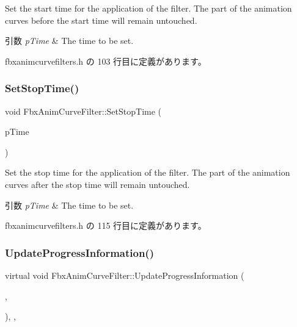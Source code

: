 Set the start time for the application of the filter. The part of the animation curves before the start time will remain untouched. 
\begin{DoxyParams}{引数}
{\em p\+Time} & The time to be set. \\
\hline
\end{DoxyParams}


 fbxanimcurvefilters.\+h の 103 行目に定義があります。

\mbox{\label{class_fbx_anim_curve_filter_a75fd5bf41a315dd12d8efb3184a17fc8}} 
\subsubsection{\texorpdfstring{Set\+Stop\+Time()}{SetStopTime()}}
{\footnotesize\ttfamily void Fbx\+Anim\+Curve\+Filter\+::\+Set\+Stop\+Time (\begin{DoxyParamCaption}\item[{\hyperlink{class_fbx_time}{Fbx\+Time} \&}]{p\+Time }\end{DoxyParamCaption})\hspace{0.3cm}{\ttfamily [inline]}}

Set the stop time for the application of the filter. The part of the animation curves after the stop time will remain untouched. 
\begin{DoxyParams}{引数}
{\em p\+Time} & The time to be set. \\
\hline
\end{DoxyParams}


 fbxanimcurvefilters.\+h の 115 行目に定義があります。

\mbox{\label{class_fbx_anim_curve_filter_ac9403f06db2fd928f29d68d755a26c1b}} 
\subsubsection{\texorpdfstring{Update\+Progress\+Information()}{UpdateProgressInformation()}}
{\footnotesize\ttfamily virtual void Fbx\+Anim\+Curve\+Filter\+::\+Update\+Progress\+Information (\begin{DoxyParamCaption}\item[{\hyperlink{class_fbx_time}{Fbx\+Time}}]{,  }\item[{\hyperlink{class_fbx_time}{Fbx\+Time}}]{ }\end{DoxyParamCaption})\hspace{0.3cm}{\ttfamily [inline]}, {\ttfamily [protected]}, {\ttfamily [virtual]}}



